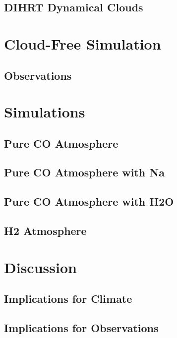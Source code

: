 \subsection{DIHRT Dynamical Clouds}



\section{Cloud-Free Simulation}

\subsection{Observations}




\section{Simulations}


\subsection{Pure CO Atmosphere}

\subsection{Pure CO Atmosphere with Na}

\subsection{Pure CO Atmosphere with H2O}

\subsection{H2 Atmosphere}


\section{Discussion}

\subsection{Implications for Climate}

\subsection{Implications for Observations}



